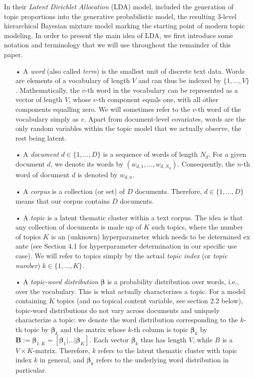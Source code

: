 \documentclass[12pt]{article}
\begin{document}
In their \textit{Latent Dirichlet Allocation} (LDA) model, \cite{blei2003latent} included the generation of topic proportions into the generative probabilistic model, the resulting 3-level hierarchical Bayesian mixture model marking the starting point of modern topic modeling. In order to present the main idea of LDA, we first introduce some notation and terminology that we will use throughout the remainder of this paper.

\begin{itemize}
\vspace{-0.25cm}
\item[•] A \textit{word} (also called \textit{term}) is the smallest unit of discrete text data. Words are elements of a vocabulary of length $V$ and can thus be indexed by $\{1,\dots,V\}$. Mathematically, the $v$-th word in the vocabulary can be represented as a vector of length $V$, whose $v$-th component equals one, with all other components equalling zero. We will sometimes refer to the $v$-th word of the vocabulary simply as $v$. Apart from document-level covariates, words are the only random variables within the topic model that we actually observe, the rest being latent.
\vspace{-0.25cm}
\item[•] A \textit{document} $d \in \{1,\dots,D\}$ is a sequence of words of length $N_{d}$. For a given document $d$, we denote its words by $(w_{d,1},\dots,w_{d,N_{d}})$. Consequently, the $n$-th word of document $d$ is denoted by $w_{d,n}$.
\vspace{-0.25cm}
\item[•] A \textit{corpus} is a collection (or set) of $D$ documents. Therefore, $d \in \{1,\dots,D\}$ means that our corpus contains $D$ documents.
\vspace{-0.25cm}
\item[•] A \textit{topic} is a latent thematic cluster within a text corpus. The idea is that any collection of documents is made up of $K$ such topics, where the number of topics $K$ is an (unknown) hyperparameter which needs to be determined ex ante (see Section 4.1 for hyperparameter determination in our specific use case). We will refer to topics simply by the actual \textit{topic index} (or \textit{topic number}) $k \in \{1,\dots,K\}$.
\vspace{-0.25cm}
\item[•] A \textit{topic-word distribution} $\boldsymbol{\beta}$ is a probability distribution over words, i.e., over the vocabulary. This is what actually characterizes a topic. For a model containing $K$ topics (and no topical content variable, see section 2.2 below), topic-word distributions do not vary across documents and uniquely characterize a topic: we denote the word distribution corresponding to the $k$-th topic by $\boldsymbol{\beta}_k$ and the matrix whose $k$-th column is topic $\boldsymbol{\beta}_k$ by $\boldsymbol{B}:=\boldsymbol{\beta}_{1:K}=[\boldsymbol{\beta}_1|\dots|\boldsymbol{\beta}_K]$. Each vector $\boldsymbol{\beta}_k$ thus has length $V$, while $B$ is a $V \times K$-matrix. Therefore, $k$ refers to the latent thematic cluster with topic index $k$ in general, and $\boldsymbol{\beta}_k$ refers to the underlying word distribution in particular.

\end{itemize}
\end{document}
